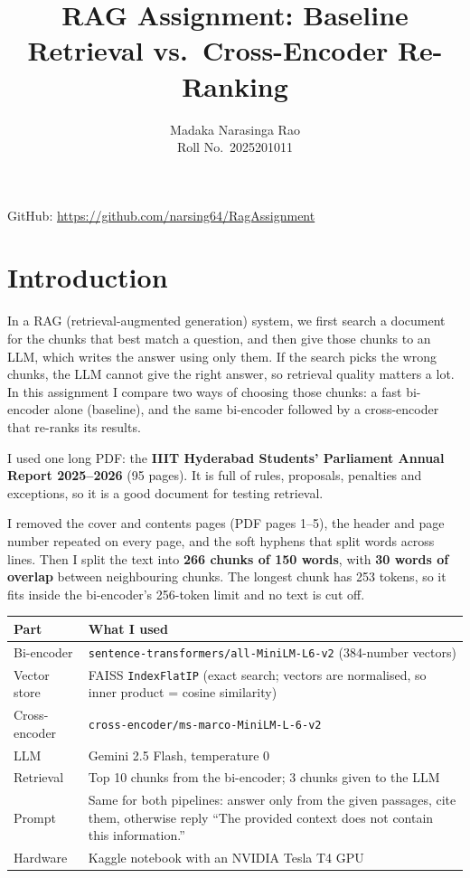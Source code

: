 \documentclass[11pt,a4paper]{article}
\title{RAG Assignment: Baseline Retrieval vs.\ Cross-Encoder Re-Ranking}
\author{Madaka Narasinga Rao\\Roll No.\ 2025201011}
\date{}
\begin{document}
\maketitle
\vspace{-2em}
\begin{center}
GitHub: \url{https://github.com/narsing64/RagAssignment}
\end{center}

\section*{Introduction}

In a RAG (retrieval-augmented generation) system, we first search a document for the chunks that best match a question, and then give those chunks to an LLM, which writes the answer using only them. If the search picks the wrong chunks, the LLM cannot give the right answer, so retrieval quality matters a lot. In this assignment I compare two ways of choosing those chunks: a fast bi-encoder alone (baseline), and the same bi-encoder followed by a cross-encoder that re-ranks its results.

I used one long PDF: the \textbf{IIIT Hyderabad Students' Parliament Annual Report 2025--2026} (95 pages). It is full of rules, proposals, penalties and exceptions, so it is a good document for testing retrieval.

I removed the cover and contents pages (PDF pages 1--5), the header and page number repeated on every page, and the soft hyphens that split words across lines. Then I split the text into \textbf{266 chunks of 150 words}, with \textbf{30 words of overlap} between neighbouring chunks. The longest chunk has 253 tokens, so it fits inside the bi-encoder's 256-token limit and no text is cut off.

\begin{center}
\begin{tabularx}{\textwidth}{l L}
\toprule
\textbf{Part} & \textbf{What I used} \\
\midrule
Bi-encoder & \texttt{sentence-transformers/all-MiniLM-L6-v2} (384-number vectors) \\
Vector store & FAISS \texttt{IndexFlatIP} (exact search; vectors are normalised, so inner product = cosine similarity) \\
Cross-encoder & \texttt{cross-encoder/ms-marco-MiniLM-L-6-v2} \\
LLM & Gemini 2.5 Flash, temperature 0 \\
Retrieval & Top 10 chunks from the bi-encoder; 3 chunks given to the LLM \\
Prompt & Same for both pipelines: answer only from the given passages, cite them, otherwise reply ``The provided context does not contain this information.'' \\
Hardware & Kaggle notebook with an NVIDIA Tesla T4 GPU \\
\bottomrule
\end{tabularx}
\end{center}
\end{document}
